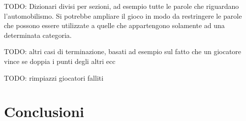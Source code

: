 \documentclass[10.5pt]{article}
\begin{document}
TODO: Dizionari divisi per sezioni, ad esempio tutte le parole che riguardano l'automobilismo. Si potrebbe ampliare il gioco in modo da restringere le parole che possono essere utilizzate a quelle che appartengono solamente ad una determinata categoria.

TODO: altri casi di terminazione, basati ad esempio sul fatto che un giocatore vince se doppia i punti degli altri ecc

TODO: rimpiazzi giocatori falliti


\section{Conclusioni}






\end{document}
